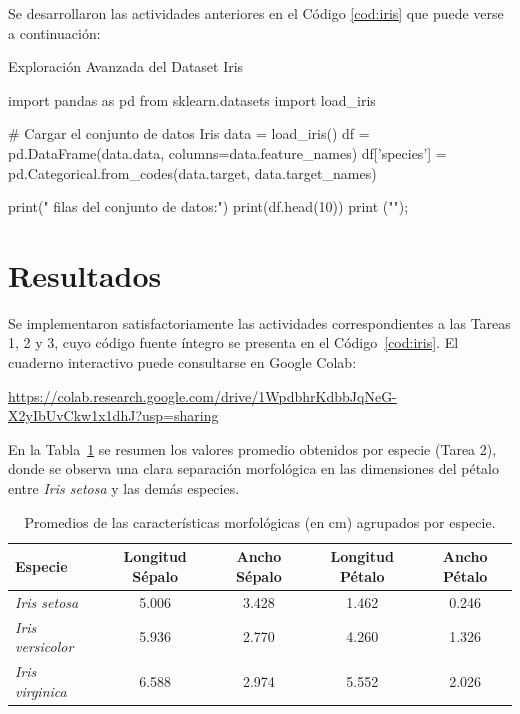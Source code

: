 \documentclass[11pt,letterpaper]{article}
\begin{document}
Se desarrollaron las actividades anteriores en el Código \ref{cod:iris} que puede verse a continuación:

\begin{codigo}[label=cod:iris]{Exploración Avanzada del Dataset Iris}

import pandas as pd
from sklearn.datasets import load_iris

# Cargar el conjunto de datos Iris
data = load_iris()
df = pd.DataFrame(data.data, columns=data.feature_names)
df['species'] = pd.Categorical.from_codes(data.target, data.target_names)

print(" filas del conjunto de datos:")
print(df.head(10))
print ("\n");
\end{codigo}

\section{Resultados}

Se implementaron satisfactoriamente las actividades correspondientes a las Tareas 1, 2 y 3, cuyo código fuente íntegro se presenta en el Código~\ref{cod:iris}. El cuaderno interactivo puede consultarse en Google Colab:

\begin{center}
    \url{https://colab.research.google.com/drive/1WpdbhrKdbbJqNeG-X2yIbUvCkw1x1dhJ?usp=sharing}
\end{center}

En la Tabla~\ref{tab:promedios_iris} se resumen los valores promedio obtenidos por especie (Tarea 2), donde se observa una clara separación morfológica en las dimensiones del pétalo entre \textit{Iris setosa} y las demás especies.

\begin{table}[htbp]
\centering
\caption{Promedios de las características morfológicas (en cm) agrupados por especie.}
\label{tab:promedios_iris}
\begin{tabular}{lcccc}
\hline
\textbf{Especie} & \textbf{Longitud Sépalo} & \textbf{Ancho Sépalo} & \textbf{Longitud Pétalo} & \textbf{Ancho Pétalo} \\
\hline
\textit{Iris setosa}     & 5.006 & 3.428 & 1.462 & 0.246 \\
\textit{Iris versicolor} & 5.936 & 2.770 & 4.260 & 1.326 \\
\textit{Iris virginica}  & 6.588 & 2.974 & 5.552 & 2.026 \\
\hline
\end{tabular}
\end{table}
\end{document}
